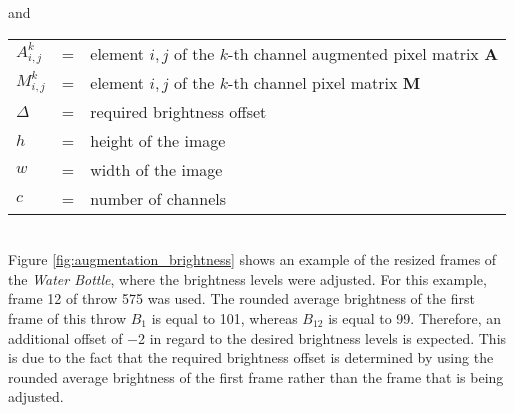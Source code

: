 and

\begin{tabular}{lll}
  $A_{i,j}^{k}$ & = & element $i,j$ of the $k$-th channel augmented pixel matrix $\boldsymbol{A}$ \\
  $M_{i,j}^{k}$ & = & element $i,j$ of the $k$-th channel pixel matrix $\boldsymbol{M}$ \\
  $\Delta$ & = & required brightness offset \\
  $h$ & = & height of the image \\
  $w$ & = & width of the image \\
  $c$ & = & number of channels \\
\end{tabular}
\\

Figure \ref{fig:augmentation_brightness} shows an example of the resized frames of the \textit{Water Bottle}, where the brightness levels were adjusted.
For this example, frame \num{12} of throw \num{575} was used.
The rounded average brightness of the first frame of this throw $B_1$ is equal to \num{101}, whereas $B_{12}$ is equal to \num{99}.
Therefore, an additional offset of \num{-2} in regard to the desired brightness levels is expected.
This is due to the fact that the required brightness offset is determined by using the rounded average brightness of the first frame rather than the frame that is being adjusted. %

